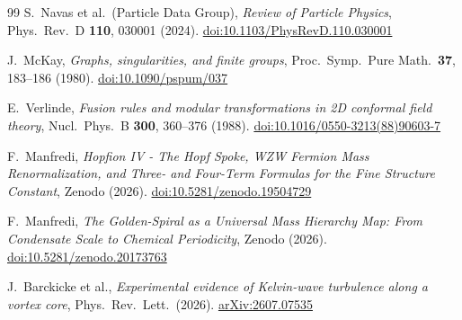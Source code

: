 \documentclass[11pt,a4paper]{article}
\theoremstyle{definition}\newtheorem{definition}[theorem]{Definition}
\theoremstyle{remark}
\begin{document}
\begin{thebibliography}{99}
S.~Navas et al.\ (Particle Data Group),
\textit{Review of Particle Physics},
Phys.\ Rev.\ D \textbf{110}, 030001 (2024).
\href{https://doi.org/10.1103/PhysRevD.110.030001}{doi:10.1103/PhysRevD.110.030001}

J.~McKay,
\textit{Graphs, singularities, and finite groups},
Proc.\ Symp.\ Pure Math.\ \textbf{37}, 183--186 (1980).
\href{https://doi.org/10.1090/pspum/037}{doi:10.1090/pspum/037}

E.~Verlinde,
\textit{Fusion rules and modular transformations in 2D conformal field theory},
Nucl.\ Phys.\ B \textbf{300}, 360--376 (1988).
\href{https://doi.org/10.1016/0550-3213(88)90603-7}{doi:10.1016/0550-3213(88)90603-7}

F.~Manfredi,
\textit{Hopfion IV - The Hopf Spoke, WZW Fermion Mass Renormalization, and Three- and Four-Term Formulas for the Fine Structure Constant},
Zenodo (2026).
\href{https://doi.org/10.5281/zenodo.19504729}{doi:10.5281/zenodo.19504729}

F.~Manfredi,
\textit{The Golden-Spiral as a Universal Mass Hierarchy Map: From Condensate Scale to Chemical Periodicity},
Zenodo (2026).
\href{https://doi.org/10.5281/zenodo.20173763}{doi:10.5281/zenodo.20173763}

J.~Barckicke et al.,
\textit{Experimental evidence of Kelvin-wave turbulence along a vortex core},
Phys.\ Rev.\ Lett.\ (2026).
\href{https://arxiv.org/abs/2607.07535}{arXiv:2607.07535}

\end{thebibliography}
\end{document}

